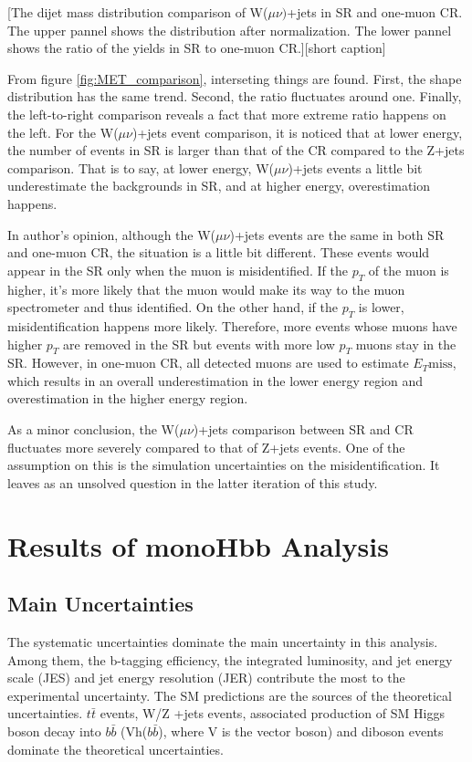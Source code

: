 \documentclass[class=NCU_thesis, crop=false]{standalone}
\begin{document}
		[The dijet mass distribution comparison of W($\mu \nu)$+jets in SR and one-muon CR. The upper pannel shows the distribution after normalization. The lower pannel shows the ratio of the yields in SR to one-muon CR.][short caption]
		
		From figure \ref{fig:MET_comparison}, interseting things are found. First, the shape distribution has the same trend. Second, the ratio fluctuates around one. Finally, the left-to-right comparison reveals a fact that more extreme ratio happens on the left. For the W($\mu \nu$)+jets event comparison, it is noticed that at lower energy, the number of events in SR is larger than that of the CR compared to the Z+jets comparison. That is to say, at lower energy, W($\mu \nu$)+jets events a little bit underestimate the backgrounds in SR, and at higher energy, overestimation happens.
		
		In author's opinion, although the W($\mu \nu$)+jets events are the same in both SR and one-muon CR, the situation is a little bit different. These events would appear in the SR only when the muon is misidentified. If the $p_T$ of the muon is higher, it's more likely that the muon would make its way to the muon spectrometer and thus identified. On the other hand, if the $p_T$ is lower, misidentification happens more likely. Therefore, more events whose muons have higher $p_T$ are removed in the SR but events with more low $p_T$ muons stay in the SR. However, in one-muon CR, all detected muons are used to estimate $E_T{\mathrm{miss}}$, which results in an overall underestimation in the lower energy region and overestimation in the higher energy region.
		
		As a minor conclusion, the W($\mu \nu$)+jets comparison between SR and CR fluctuates more severely compared to that of Z+jets events. One of the assumption on this is the simulation uncertainties on the misidentification. It leaves as an unsolved question in the latter iteration of this study.

\chapter{Results of monoHbb Analysis}

\section{Main Uncertainties}
	The systematic uncertainties dominate the main uncertainty in this analysis. Among them, the b-tagging efficiency, the integrated luminosity, and jet energy scale (JES) and jet energy resolution (JER) contribute the most to the experimental uncertainty. The SM predictions are the sources of the theoretical uncertainties. $t\bar{t}$ events, W/Z +jets events, associated production of SM Higgs boson decay into $b\bar{b}$ (Vh($b\bar{b}$), where V is the vector boson) and diboson events dominate the theoretical uncertainties.
	
\end{document}
